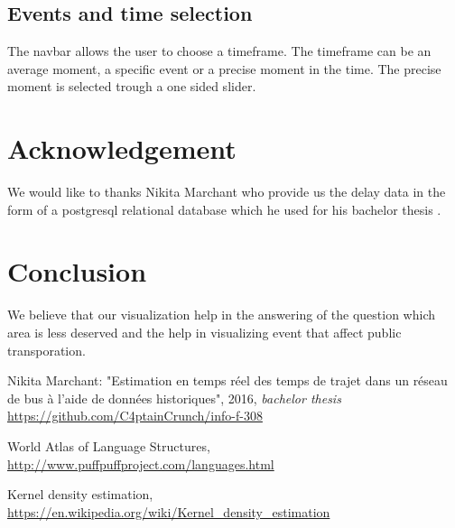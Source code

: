 \documentclass[11pt]{article}%
\begin{document}
\subsection{Events and time selection}

The navbar allows the user to choose a timeframe. The timeframe can be an average moment, a specific event or a precise moment in the time. The precise moment is selected trough a one sided slider.

\section{Acknowledgement}

We would like to thanks Nikita Marchant who provide us the delay data in the form of a postgresql relational database which he used for his bachelor thesis \cite{nikita}. 

\section{Conclusion}
We believe that our visualization help in the answering of the question which area is less deserved and the help in visualizing event that affect public transporation. 

 
\begin{thebibliography}{9}
 
Nikita Marchant: "Estimation en temps réel des temps de trajet dans un réseau de bus à l'aide de données historiques", 2016, \textit{bachelor thesis}
\\\url{https://github.com/C4ptainCrunch/info-f-308}

World Atlas of Language Structures,
\\\url{http://www.puffpuffproject.com/languages.html}

Kernel density estimation,
\\\url{https://en.wikipedia.org/wiki/Kernel_density_estimation}



\end{thebibliography}
\end{document}
